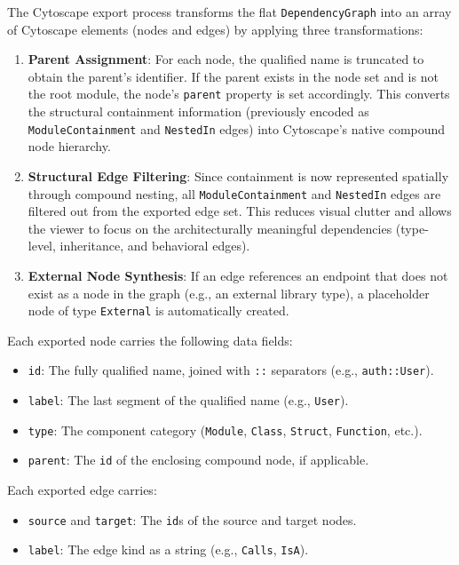 The Cytoscape export process transforms the flat \texttt{DependencyGraph} into an array of Cytoscape elements (nodes and edges) by applying three transformations:

\begin{enumerate}
  \item \textbf{Parent Assignment}: For each node, the qualified name is truncated to obtain the parent's identifier. If the parent exists in the node set and is not the root module, the node's \texttt{parent} property is set accordingly. This converts the structural containment information (previously encoded as \texttt{ModuleContainment} and \texttt{NestedIn} edges) into Cytoscape's native compound node hierarchy.
  \item \textbf{Structural Edge Filtering}: Since containment is now represented spatially through compound nesting, all \texttt{ModuleContainment} and \texttt{NestedIn} edges are filtered out from the exported edge set. This reduces visual clutter and allows the viewer to focus on the architecturally meaningful dependencies (type-level, inheritance, and behavioral edges).
  \item \textbf{External Node Synthesis}: If an edge references an endpoint that does not exist as a node in the graph (e.g., an external library type), a placeholder node of type \texttt{External} is automatically created.
\end{enumerate}

Each exported node carries the following data fields:
\begin{itemize}
  \item \texttt{id}: The fully qualified name, joined with \texttt{::} separators (e.g., \texttt{auth::User}).
  \item \texttt{label}: The last segment of the qualified name (e.g., \texttt{User}).
  \item \texttt{type}: The component category (\texttt{Module}, \texttt{Class}, \texttt{Struct}, \texttt{Function}, etc.).
  \item \texttt{parent}: The \texttt{id} of the enclosing compound node, if applicable.
\end{itemize}

Each exported edge carries:
\begin{itemize}
  \item \texttt{source} and \texttt{target}: The \texttt{id}s of the source and target nodes.
  \item \texttt{label}: The edge kind as a string (e.g., \texttt{Calls}, \texttt{IsA}).
\end{itemize}

